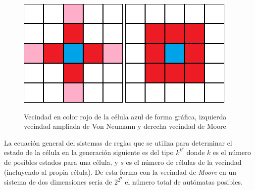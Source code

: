 \begin{figure}[H]
\centering
\includegraphics[scale=0.5]{imagenes/CA_Neumann.png}
\hspace{2cm}
\includegraphics[scale=0.5]{imagenes/CA-Moore.png}
\caption{Vecindad en color rojo de la célula azul de forma gráfica, izquierda vecindad ampliada de Von Neumann y derecha vecindad de Moore}
\label{fig:vecindad}

\end{figure}

La ecuación general del sistemas de reglas que se utiliza para determinar el estado de la célula en la generación siguiente es del tipo $k^{k^s}$ donde $k$ es el número de posibles estados para una célula, y $s$ es el número de células de la vecindad (incluyendo al propia célula). De esta forma con la vecindad de \textit{Moore} en un sistema de dos dimensiones sería de $2^{2^9}$ el número total de autómatas posibles.\\


